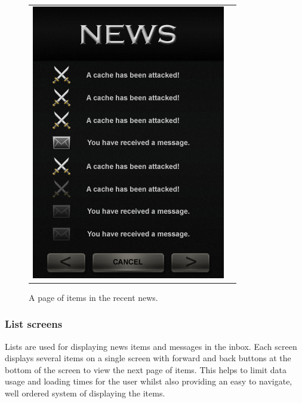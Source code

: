 \begin{figure}[h!]
\begin{tabular}{cc}
\begin{minipage}{0.3\textwidth}
\begin{center}
\begin{minipage}{0.83\textwidth}
		\includegraphics[width=\textwidth]{images/news_mockup}
	\caption{A page of items in the recent news.}
	\label{recent_news}
		\end{minipage}
		\end{center}
	\end{minipage}
\end{tabular}
\vspace{-0pt}
\end{figure}

\subsubsection{List screens}

Lists are used for displaying news items and messages in the inbox. Each screen displays several items on a single screen with forward and back buttons at the bottom of the screen to view the next page of items. This helps to limit data usage and loading times for the user whilst also providing an easy to navigate, well ordered system of displaying the items.

